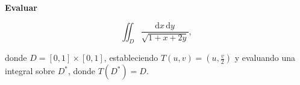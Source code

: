 \textbf{Evaluar}

\[
\iint_D \frac{\mathrm{d}x \, \mathrm{d}y}{\sqrt{1+x+2y}},
\]

donde \(D = [0,1] \times [0,1]\), estableciendo \(T(u,v) = (u, \frac{v}{2})\) y evaluando una integral sobre \(D^*\), donde \(T(D^*) = D\).
